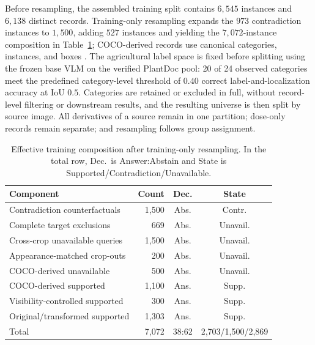 \documentclass[letterpaper]{article}
\begin{document}
Before resampling, the assembled training split contains $6{,}545$ instances and $6{,}138$ distinct records. Training-only resampling expands the $973$ contradiction instances to $1{,}500$, adding $527$ instances and yielding the $7{,}072$-instance composition in Table~\ref{tab:composition}; COCO-derived records use canonical categories, instances, and boxes \citep{lin2014coco}. The agricultural label space is fixed before splitting using the frozen base VLM on the verified PlantDoc pool: 20 of 24 observed categories meet the predefined category-level threshold of $0.40$ correct label-and-localization accuracy at IoU $0.5$. Categories are retained or excluded in full, without record-level filtering or downstream results, and the resulting universe is then split by source image. All derivatives of a source remain in one partition; dose-only records remain separate; and resampling follows group assignment.

\begin{table}[t]
\centering
\small
\setlength{\tabcolsep}{1mm}
\begin{tabular}{@{}>{\raggedright\arraybackslash}p{}rcc@{}}
\toprule
Component & Count & Dec. & State \\
\midrule
Contradiction counterfactuals & 1,500 & Abs. & Contr. \\
Complete target exclusions & 669 & Abs. & Unavail. \\
Cross-crop unavailable queries & 1,500 & Abs. & Unavail. \\
Appearance-matched crop-outs & 200 & Abs. & Unavail. \\
COCO-derived unavailable & 500 & Abs. & Unavail. \\
COCO-derived supported & 1,100 & Ans. & Supp. \\
Visibility-controlled supported & 300 & Ans. & Supp. \\
Original/transformed supported & 1,303 & Ans. & Supp. \\
\midrule
Total & 7,072 & 38:62 & 2,703/1,500/2,869 \\
\bottomrule
\end{tabular}
\caption{Effective training composition after training-only resampling. In the total row, Dec.\ is Answer:Abstain and State is Supported/Contradiction/Unavailable.}
\label{tab:composition}
\end{table}
\end{document}
